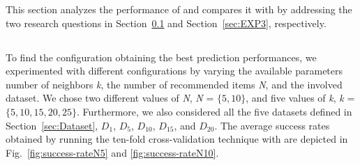 This section analyzes the performance of \TF and compares it with \MNB by addressing the two research questions in Section~\ref{sec:EXP1} and Section~\ref{sec:EXP3}, respectively.



\subsection{\rqfirst} \label{sec:EXP1}
  
To find the configuration obtaining the best prediction performances, we experimented with different \TF configurations by varying the available parameters \ie number of neighbors \emph{k}, the number of recommended items \emph{N}, and the involved dataset.   %
We chose two different values of \emph{N}, \ie \emph{N} = $\{5, 10\}$, and five values of \emph{k}, \ie \emph{k} = $\{5, 10, 15, 20, 25\}$. Furthermore, we also considered all the five datasets defined in Section~\ref{sec:Dataset}, \ie $D_{1}$, $D_{5}$, $D_{10}$, $D_{15}$, and $D_{20}$. The average success rates obtained by running the ten-fold cross-validation technique with \TFa are depicted in Fig.~\ref{fig:success-rateN5} and \ref{fig:success-rateN10}.


